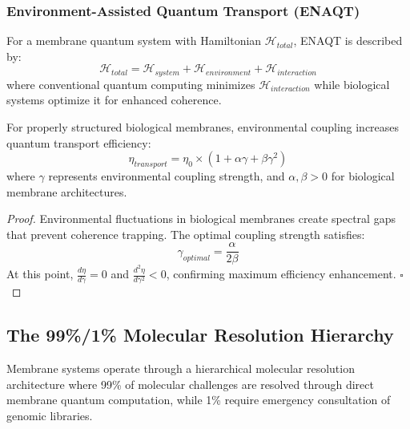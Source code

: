 \documentclass[11pt,a4paper]{article}
\begin{document}
\subsubsection{Environment-Assisted Quantum Transport (ENAQT)}

\begin{definition}
For a membrane quantum system with Hamiltonian $\mathcal{H}_{total}$, ENAQT is described by:
\begin{equation}
\mathcal{H}_{total} = \mathcal{H}_{system} + \mathcal{H}_{environment} + \mathcal{H}_{interaction}
\end{equation}
where conventional quantum computing minimizes $\mathcal{H}_{interaction}$ while biological systems optimize it for enhanced coherence.
\end{definition}

\begin{theorem}
For properly structured biological membranes, environmental coupling increases quantum transport efficiency:
\begin{equation}
\eta_{transport} = \eta_0 \times (1 + \alpha \gamma + \beta \gamma^2)
\end{equation}
where $\gamma$ represents environmental coupling strength, and $\alpha, \beta > 0$ for biological membrane architectures.
\end{theorem}

\begin{proof}
Environmental fluctuations in biological membranes create spectral gaps that prevent coherence trapping. The optimal coupling strength satisfies:
\begin{equation}
\gamma_{optimal} = \frac{\alpha}{2\beta}
\end{equation}
At this point, $\frac{d\eta}{d\gamma} = 0$ and $\frac{d^2\eta}{d\gamma^2} < 0$, confirming maximum efficiency enhancement. $\square$
\end{proof}

\subsection{The 99\%/1\% Molecular Resolution Hierarchy}

Membrane systems operate through a hierarchical molecular resolution architecture where 99\% of molecular challenges are resolved through direct membrane quantum computation, while 1\% require emergency consultation of genomic libraries.
\end{document}
